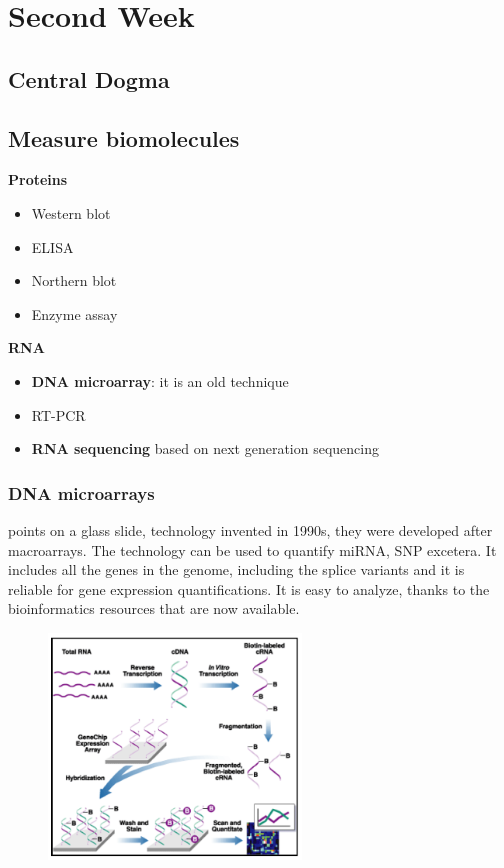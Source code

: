 \graphicspath{{chapters/images/02/}}

\chapter{Second Week}

\section{Central Dogma}

\section{Measure biomolecules}
\textbf{Proteins}
\begin{itemize}
	\item Western blot
	\item ELISA
	\item Northern blot
	\item Enzyme assay
\end{itemize}


\textbf{RNA}
\begin{itemize}
	\item \textbf{DNA microarray}: it is an old technique
	\item RT-PCR
	\item \textbf{RNA sequencing} based on next generation sequencing  
\end{itemize}

\subsection{DNA microarrays}
points on a glass slide, technology invented in 1990s, they were developed after macroarrays.
The technology can be used to quantify miRNA, SNP excetera. It includes all the genes in the genome, including the splice variants and it is reliable for gene expression quantifications. It is easy to analyze, thanks to the bioinformatics resources that are now available.

\begin{figure}[h]
\caption{}
\centering
\includegraphics[width=0.6\textwidth]{microarrays}
\end{figure}

